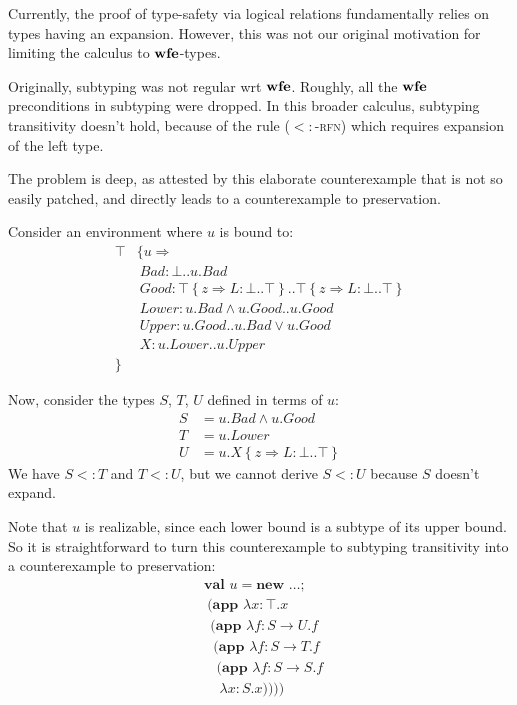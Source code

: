 \documentclass[9pt]{sigplanconf}
\newcommand{\sub}{<:}
\newcommand{\nswfe}{\mbox{\textbf{wfe}}}
\newcommand{\tfun}{\rightarrow}
\newcommand{\tand}{\wedge}
\newcommand{\tor}{\vee}
\newcommand{\refine}[2]{\left\{#1 \Rightarrow #2 \right\}}
\newcommand{\mlrefine}[2]{\{#1 \Rightarrow #2 \}}
\newcommand{\abs}[3]{\lambda #1\!:\!#2.#3}
\newcommand{\mlnew}[3]{\textbf{val }#1 = \textbf{new }#2 ;\;\\&#3}
\newcommand{\Ldecl}[3]{#1 : #2..#3}%
\newcommand{\Top}{\top}%
\newcommand{\Bot}{\bot}%
\newcommand{\mlapp}[2]{(\textbf{app }#1\;\\&#2)}
\begin{document}
Currently, the proof of type-safety via logical relations
fundamentally relies on types having an expansion. However, this was
not our original motivation for limiting the calculus to $\nswfe$-types.

Originally, subtyping was not regular wrt $\nswfe$. Roughly,
all the $\nswfe$ preconditions in subtyping were dropped. In this
broader calculus, subtyping transitivity doesn't hold, because of the
rule (\textsc{$\sub$-rfn}) which requires expansion of the left type.

The problem is deep, as attested by this elaborate counterexample
that is not so easily patched, and directly leads to a counterexample
to preservation.

Consider an environment where $u$ is bound to:
\begin{align*}
\Top & \mlrefine u {\\
&\ \Ldecl {\mathit{Bad}} {\Bot} {u.\mathit{Bad}}\\
&\ \Ldecl {\mathit{Good}} {\Top \refine z {\Ldecl L \Bot \Top}} {\Top \refine z {\Ldecl L \Bot \Top}}\\
&\ \Ldecl {\mathit{Lower}} {u.\mathit{Bad} \tand u.\mathit{Good}} {u.\mathit{Good}}\\
&\ \Ldecl {\mathit{Upper}} {u.\mathit{Good}} {u.\mathit{Bad} \tor u.\mathit{Good}}\\
&\ \Ldecl X {u.\mathit{Lower}} {u.\mathit{Upper}}\\
}&
\end{align*}

Now, consider the types $S$, $T$, $U$ defined in terms of $u$:
\begin{align*}
S &= u.\mathit{Bad} \tand u.\mathit{Good}\\
T &= u.\mathit{Lower}\\
U &= u.X \refine z {\Ldecl L \Bot \Top}
\end{align*}
We have $S \sub T$ and $T \sub U$, but we cannot derive $S \sub U$ because
$S$ doesn't expand.

Note that $u$ is realizable, since each lower bound is a subtype of
its upper bound. So it is straightforward to turn this counterexample
to subtyping transitivity into a counterexample to preservation:
\begin{align*}
&\mlnew u \ldots {
\ \mlapp{\abs x \Top x}{
\ \ \mlapp{\abs f {S \tfun U} f}{
\ \ \ \mlapp{\abs f {S \tfun T} f}{
\ \ \ \ \mlapp{\abs f {S \tfun S} f}{
\ \ \  \ \ \abs x S x}}}}}
\end{align*}
\end{document}
